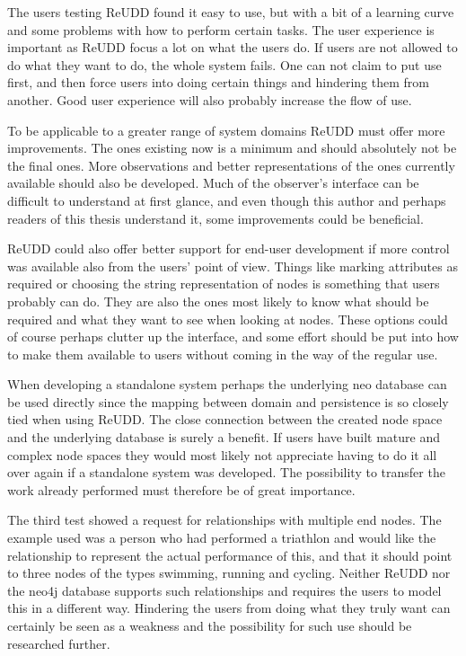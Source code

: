 \documentclass[a4paper]{report}
\begin{document}
The users testing ReUDD found it easy to use, but with a bit of a learning curve and some problems with how to perform certain tasks. The user experience is important as ReUDD focus a lot on what the users do. If users are not allowed to do what they want to do, the whole system fails. One can not claim to put use first, and then force users into doing certain things and hindering them from another. Good user experience will also probably increase the flow of use.

To be applicable to a greater range of system domains ReUDD must offer more improvements. The ones existing now is a minimum and should absolutely not be the final ones. More observations and better representations of the ones currently available should also be developed. Much of the observer's interface can be difficult to understand at first glance, and even though this author and perhaps readers of this thesis understand it, some improvements could be beneficial.

ReUDD could also offer better support for end-user development if more control was available also from the users' point of view. Things like marking attributes as required or choosing the string representation of nodes is something that users probably can do. They are also the ones most likely to know what should be required and what they want to see when looking at nodes. These options could of course perhaps clutter up the interface, and some effort should be put into how to make them available to users without coming in the way of the regular use.

When developing a standalone system perhaps the underlying neo database can be used directly since the mapping between domain and persistence is so closely tied when using ReUDD. The close connection between the created node space and the underlying database is surely a benefit. If users have built mature and complex node spaces they would most likely not appreciate having to do it all over again if a standalone system was developed. The possibility to transfer the work already performed must therefore be of great importance.

The third test showed a request for relationships with multiple end nodes. The example used was a person who had performed a triathlon and would like the relationship to represent the actual performance of this, and that it should point to three nodes of the types swimming, running and cycling. Neither ReUDD nor the neo4j database supports such relationships and requires the users to model this in a different way. Hindering the users from doing what they truly want can certainly be seen as a weakness and the possibility for such use should be researched further.
\end{document}
